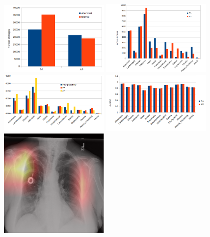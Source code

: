 \documentclass[12pt,oneside,a4paper]{report}
\begin{document}
\begin{figure}[H]
  \centering
  \includegraphics[width=0.48\textwidth]{images/charts/view_basic}\hspace{0.01\textwidth}%
  \includegraphics[width=0.48\textwidth]{images/charts/view_detailed}\\[0.01\textwidth]
  \includegraphics[width=0.48\textwidth]{images/charts/view_probs}\hspace{0.01\textwidth}%
  \includegraphics[width=0.48\textwidth]{images/charts/view_auc}\\[0.01\textwidth]
  \includegraphics[width=0.48\textwidth]{images/view1_cropped}\hspace{0.01\textwidth}%

\end{figure}
\end{document}

